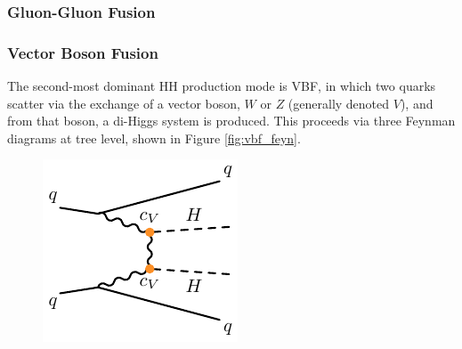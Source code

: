 \subsubsection{Gluon-Gluon Fusion}


\subsubsection{Vector Boson Fusion}
The second-most dominant HH production mode is \gls{VBF}, in which two quarks scatter via the exchange of a vector boson, $W$ or $Z$ (generally denoted $V$), and from that boson, a di-Higgs system is produced. This proceeds via three Feynman diagrams at tree level, shown in Figure \ref{fig:vbf_feyn}.

\begin{figure}[!thp]
    \begin{minipage}[c]{.31\textwidth}
        \includegraphics[width=\textwidth]{chapters/chapter1_theory/images/vbf_cv.pdf}
    \end{minipage}
    \begin{minipage}[c]{.31\textwidth}

\end{minipage}
\end{figure}
